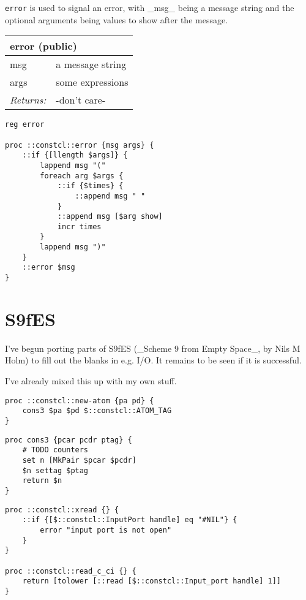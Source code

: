 \documentclass{report}
\begin{document}
\texttt{error} is used to signal an error, with \_msg\_ being a message string and the optional arguments being values to show after the message.

\begin{tabular}{ |l l| }
\hline
\multicolumn{2}{|l|}{error (public)} \\
\hline
msg & a message string \\
args & some expressions \\
\textit{Returns:} & -don't care- \\
\hline
\end{tabular}

\noindent\makebox[\linewidth]{\rule{\linewidth}{0.4pt}}
\begin{lstlisting}
reg error
 
proc ::constcl::error {msg args} {
    ::if {[llength $args]} {
        lappend msg "("
        foreach arg $args {
            ::if {$times} {
                ::append msg " "
            }
            ::append msg [$arg show]
            incr times
        }
        lappend msg ")"
    }
    ::error $msg
}
\end{lstlisting}
\noindent\makebox[\linewidth]{\rule{\linewidth}{0.4pt}}
\section{S9fES}
\label{s9fes}

I've begun porting parts of S9fES (\_Scheme 9 from Empty Space\_, by Nils M Holm) to fill out the blanks in e.g. I/O. It remains to be seen if it is successful.


I've already mixed this up with my own stuff.

\noindent\makebox[\linewidth]{\rule{\linewidth}{0.4pt}}
\begin{lstlisting}
proc ::constcl::new-atom {pa pd} {
    cons3 $pa $pd $::constcl::ATOM_TAG
}
\end{lstlisting}
\noindent\makebox[\linewidth]{\rule{\linewidth}{0.4pt}}
\noindent\makebox[\linewidth]{\rule{\linewidth}{0.4pt}}
\begin{lstlisting}
proc cons3 {pcar pcdr ptag} {
    # TODO counters
    set n [MkPair $pcar $pcdr]
    $n settag $ptag
    return $n
}
\end{lstlisting}
\noindent\makebox[\linewidth]{\rule{\linewidth}{0.4pt}}
\noindent\makebox[\linewidth]{\rule{\linewidth}{0.4pt}}
\begin{lstlisting}
proc ::constcl::xread {} {
    ::if {[$::constcl::InputPort handle] eq "#NIL"} {
        error "input port is not open"
    }
}
 
proc ::constcl::read_c_ci {} {
    return [tolower [::read [$::constcl::Input_port handle] 1]]
}
\end{lstlisting}
\noindent\makebox[\linewidth]{\rule{\linewidth}{0.4pt}}
\end{document}

